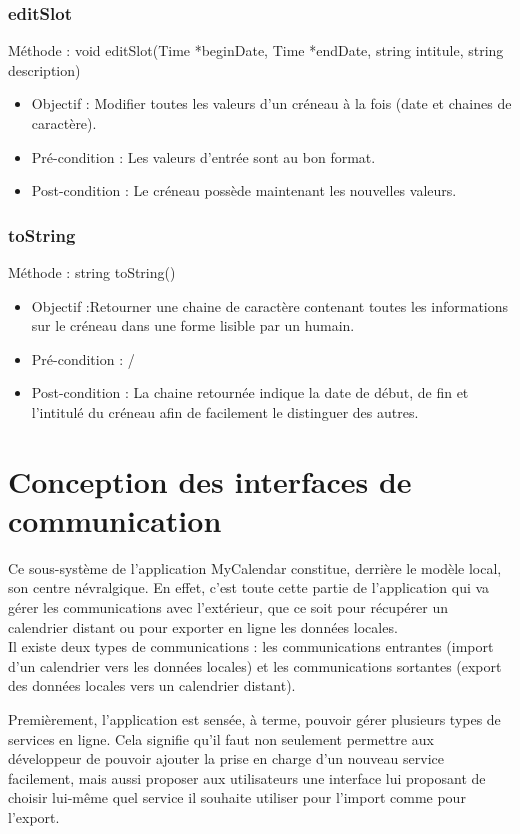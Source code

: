    		\subsection*{editSlot}
            Méthode : void editSlot(Time *beginDate, Time *endDate, string intitule, string description)
			\begin{itemize}
				\item Objectif  : Modifier toutes les valeurs d'un créneau à la fois (date et chaines de caractère).
				\item Pré-condition : Les valeurs d'entrée sont au bon format.
				\item Post-condition : Le créneau possède maintenant les nouvelles valeurs.
			\end{itemize}
			
   		\subsection*{toString}
            Méthode : string toString()
			\begin{itemize}
				\item Objectif  :Retourner une chaine de caractère contenant toutes les informations sur le créneau dans une forme lisible par un humain.
				\item Pré-condition : /
				\item Post-condition : La chaine retournée indique la date de début, de fin et l'intitulé du créneau afin de facilement le distinguer des autres.
			\end{itemize}

\chapter{Conception des interfaces de communication}
	Ce sous-système de l'application MyCalendar constitue, derrière le modèle local, son centre névralgique. En effet, c'est toute cette partie de l'application qui va gérer les communications avec l'extérieur, que ce soit pour récupérer un calendrier distant ou pour exporter en ligne les données locales.\\
	
	Il existe deux types de communications : les communications entrantes (import d'un calendrier vers les données locales) et les communications sortantes (export des données locales vers un calendrier distant).
	
	Premièrement, l'application est sensée, à terme, pouvoir gérer plusieurs types de services en ligne. Cela signifie qu'il faut non seulement permettre aux développeur de pouvoir ajouter la prise en charge d'un nouveau service facilement, mais aussi proposer aux utilisateurs une interface lui proposant de choisir lui-même quel service il souhaite utiliser pour l'import comme pour l'export.
	
